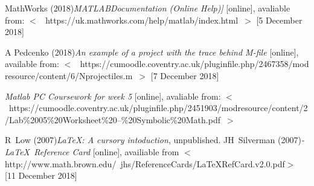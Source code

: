 \documentclass[10pt,a4paper]{article}
\begin{document}
		
	\flushleft
	
	 MathWorks (2018){\it MATLAB\textregistered Documentation (Online Help)]} [online], avaliable from: $<$~ https://uk.mathworks.com/help/matlab/index.html~$>$ [5 December 2018]
	
	 A Pedcenko (2018){\it An example of a project with the trace behind M-file} [online], available from: $<$~ https://cumoodle.coventry.ac.uk/pluginfile.php/2467358/mod{\textunderscore} resource/content/6/N{\textunderscore}projectiles.m~$>$ [7 December 2018]
	
	 {\it{Matlab PC Coursework for week 5}} [online], avaliable from: $<$~https://cumoodle.coventry.ac.uk/pluginfile.php/2451903/mod\textunderscore resource/content/2/Lab\%2005\%20Worksheet\%20--\%20Symbolic\%20Math.pdf~$>$
	
	
	
	
	 R~Low (2007){\it \LaTeX: A cursory intoduction}, unpublished.
	 JH~Silverman (2007){\it \AmS-\LaTeX\ Reference Card} [online], availiable from $<$http://www.math.brown.edu/~jhs/ReferenceCards/LaTeXRefCard.v2.0.pdf$>$ [11 December 2018]
	
	\endthebibliography
\end{document}
